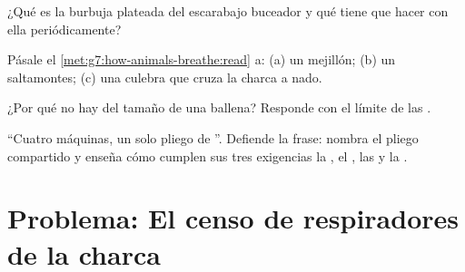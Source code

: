 \begin{exercise}[$\star\star$]\label{exo:g7:how-animals-breathe:9}
¿Qué es la burbuja plateada del escarabajo buceador y qué tiene que
hacer con ella periódicamente?
\end{exercise}

\begin{exercise}[$\star\star$]\label{exo:g7:how-animals-breathe:10}
Pásale el \cref{met:g7:how-animals-breathe:read} a: (a) un mejillón;
(b) un saltamontes; (c) una culebra que cruza la charca a nado.
\end{exercise}

\begin{exercise}[$\star\star$]\label{exo:g7:how-animals-breathe:11}
¿Por qué no hay  del tamaño de una ballena? Responde con el
límite de las .
\end{exercise}

\begin{exercise}[$\star\star\star$]\label{exo:g7:how-animals-breathe:12}
``Cuatro máquinas, un solo pliego de ''. Defiende la frase:
nombra el pliego compartido y enseña cómo cumplen sus tres exigencias
la , el , las  y la .
\end{exercise}

\section{Problema: El censo de respiradores de la charca}

